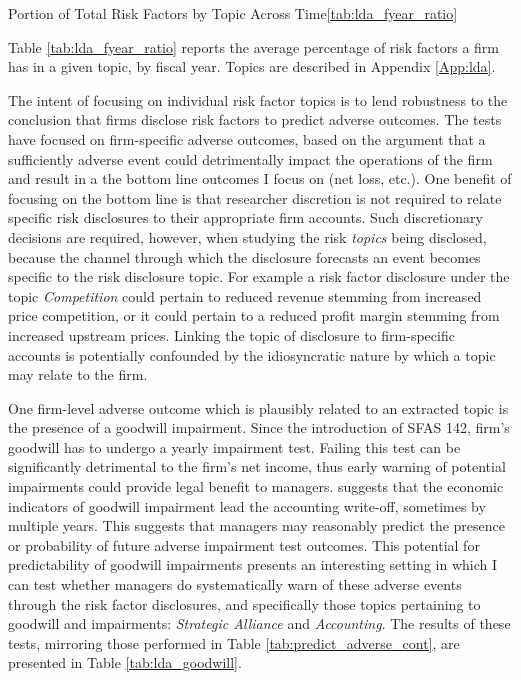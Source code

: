 \begin{thesistable}{Portion of Total Risk Factors by Topic Across Time}{\ref{tab:lda_fyear_ratio}}
	\label{tab:lda_fyear_ratio}
	
	Table \ref{tab:lda_fyear_ratio} reports the average percentage of risk factors a firm has in a given topic, by fiscal year.
	Topics are described in Appendix \ref{App:lda}.
	
	\startdata
	
\end{thesistable}


The intent of focusing on individual risk factor topics is to lend robustness to the conclusion that firms disclose risk factors to predict adverse outcomes.
The tests have focused on firm-specific adverse outcomes, based on the argument that a sufficiently adverse event could detrimentally impact the operations of the firm and result in a the bottom line outcomes I focus on (net loss, etc.).
One benefit of focusing on the bottom line is that researcher discretion is not required to relate specific risk disclosures to their appropriate firm accounts.
Such discretionary decisions are required, however, when studying the risk \textit{topics} being disclosed, because the channel through which the disclosure forecasts an event becomes specific to the risk disclosure topic.
For example a risk factor disclosure under the topic \textit{Competition} could pertain to reduced revenue stemming from increased price competition, or it could pertain to a reduced profit margin stemming from increased upstream prices.
Linking the topic of disclosure to firm-specific accounts is potentially confounded by the idiosyncratic nature by which a topic may relate to the firm.

One firm-level adverse outcome which is plausibly related to an extracted topic is the presence of a goodwill impairment.
Since the introduction of SFAS 142, firm's goodwill has to undergo a yearly impairment test.
Failing this test can be significantly detrimental to the firm's net income, thus early warning of potential impairments could provide legal benefit to managers.
\cite{hayn_2006} suggests that the economic indicators of goodwill impairment lead the accounting write-off, sometimes by multiple years.
This suggests that managers may reasonably predict the presence or probability of future adverse impairment test outcomes.
This potential for predictability of goodwill impairments presents an interesting setting in which I can test whether managers do systematically warn of these adverse events through the risk factor disclosures, and specifically those topics pertaining to goodwill and impairments: \textit{Strategic Alliance} and \textit{Accounting}.
The results of these tests, mirroring those performed in Table \ref{tab:predict_adverse_cont}, are presented in Table \ref{tab:lda_goodwill}.



